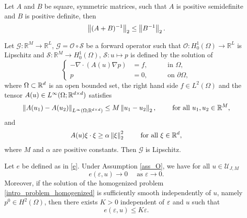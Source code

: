 \documentclass[10pt]{article}
\begin{document}
\begin{lemma} \label{lemma_inverse_sum}
Let $A$ and $B$ be square, symmetric matrices, such that $A$ is positive semidefinite and $B$ is positive definite, then
\[ \left\|(A + B)^{-1}\right\|_2 \le \left\|B^{-1}\right\|_2. \]
\end{lemma}
\begin{lemma} \label{G_lipschitz} Let $\mathcal{G} \colon \mathbb{R}^M \to \mathbb{R}^L$, $\mathcal{G} = \mathcal{O} \circ \mathcal{S}$ be a forward operator such that $\mathcal{O} \colon H^1_0(\Omega) \to \mathbb{R}^L$ is Lipschitz and $\mathcal{S} \colon \mathbb{R}^M \to H^1_0(\Omega)$, $\mathcal S\colon u \mapsto p$ is defined by the solution of
	\begin{equation} \label{problem_lemma}
	\left\{
	\begin{alignedat}{2}
	- \nabla \cdot ( {A(u) \nabla p} ) &= f,  &&\quad \text{ in } \Omega, \\
	p &= 0, &&\quad \text{ on } \partial \Omega,
	\end{alignedat}
	\right.
	\end{equation}
	where $\Omega \subset \mathbb{R}^d$ is an open bounded set, the right hand side $f \in L^2(\Omega)$ and the tensor $A(u) \in L^{\infty}(\Omega; \mathbb{R}^{d \times d})$ satisfies
	\begin{equation}
		 \left\|A(u_1) - A(u_2)\right\|_{L^{\infty}(\Omega; \mathbb{R}^{d \times d})} \le M \left\|u_1 - u_2\right\|_2, \qquad \text{ for all } u_1, u_2 \in \mathbb{R}^M,
	\end{equation}
	and
	\begin{equation}
		A(u) \xi \cdot \xi \ge \alpha \left\|\xi\right\|_2^2 \qquad \text{ for all } \xi \in \mathbb{R}^d,
	\end{equation}
	where $M$ and $\alpha$ are positive constants. Then $\mathcal G$ is Lipschitz.
\end{lemma}

\begin{lemma} \label{f_goes_to_0} Let $e$ be defined as in \eqref{e}. Under Assumption \ref{ass_O}, we have for all $u \in \mathcal U_{J,M}$
\[ e(\varepsilon, u) \to 0 \quad \text{ as } \varepsilon \to 0. \]
Moreover, if the solution of the homogenized problem \eqref{intro_problem_homogenized} is sufficiently smooth independently of $u$, namely $p^0 \in H^2(\Omega)$, then there exists $K > 0$ independent of $\varepsilon$ and $u$ such that
\[ e(\varepsilon, u) \le K \varepsilon. \]
\end{lemma}
\end{document}
